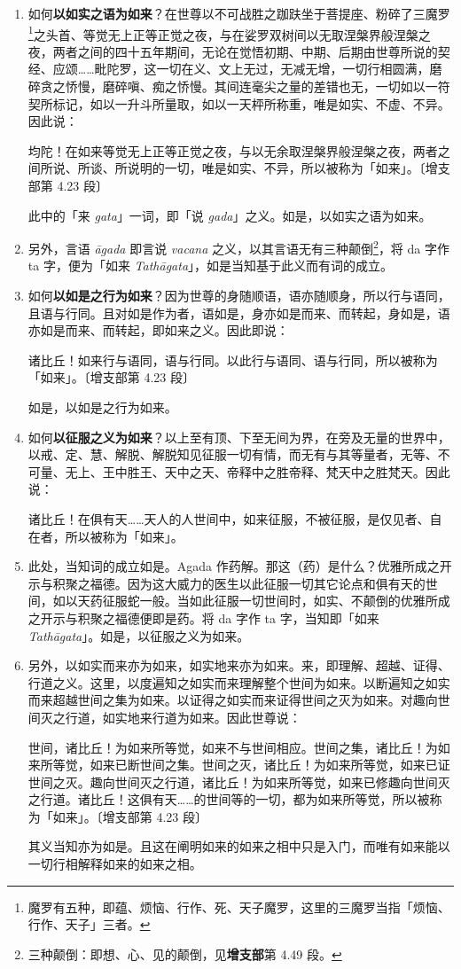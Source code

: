 \begin{enumerate}
\item 如何\textbf{以如实之语为如来}？在世尊以不可战胜之跏趺坐于菩提座、粉碎了三魔罗\footnote{魔罗有五种，即蕴、烦恼、行作、死、天子魔罗，这里的三魔罗当指「烦恼、行作、天子」三者。}之头首、等觉无上正等正觉之夜，与在娑罗双树间以无取涅槃界般涅槃之夜，两者之间的四十五年期间，无论在觉悟初期、中期、后期由世尊所说的契经、应颂……毗陀罗，这一切在义、文上无过，无减无增，一切行相圆满，磨碎贪之㤭慢，磨碎嗔、痴之㤭慢。其间连毫尖之量的差错也无，一切如以一符契所标记，如以一升斗所量取，如以一天枰所称重，唯是如实、不虚、不异。因此说：\begin{quoting}均陀！在如来等觉无上正等正觉之夜，与以无余取涅槃界般涅槃之夜，两者之间所说、所谈、所说明的一切，唯是如实、不异，所以被称为「如来」。{\bluefootnotesize 〔增支部第 4.23 段〕}\end{quoting}此中的「来 \textit{gata}」一词，即「说 \textit{gada}」之义。如是，以如实之语为如来。
\item 另外，言语 \textit{āgada} 即言说 \textit{vacana} 之义，以其言语无有三种颠倒\footnote{三种颠倒：即想、心、见的颠倒，见\textbf{增支部}第 4.49 段。}，将 da 字作 ta 字，便为「如来 \textit{Tathāgata}」，如是当知基于此义而有词的成立。
\item 如何\textbf{以如是之行为如来}？因为世尊的身随顺语，语亦随顺身，所以行与语同，且语与行同。且对如是作为者，语如是，身亦如是而来、而转起，身如是，语亦如是而来、而转起，即如来之义。因此即说：\begin{quoting}诸比丘！如来行与语同，语与行同。以此行与语同、语与行同，所以被称为「如来」。{\bluefootnotesize 〔增支部第 4.23 段〕}\end{quoting}如是，以如是之行为如来。
\item 如何\textbf{以征服之义为如来}？以上至有顶、下至无间为界，在旁及无量的世界中，以戒、定、慧、解脱、解脱知见征服一切有情，而无有与其等量者，无等、不可量、无上、王中胜王、天中之天、帝释中之胜帝释、梵天中之胜梵天。因此说：\begin{quoting}诸比丘！在俱有天……天人的人世间中，如来征服，不被征服，是仅见者、自在者，所以被称为「如来」。\end{quoting}
\item 此处，当知词的成立如是。Agada 作药解。那这（药）是什么？优雅所成之开示与积聚之福德。因为这大威力的医生以此征服一切其它论点和俱有天的世间，如以天药征服蛇一般。当如此征服一切世间时，如实、不颠倒的优雅所成之开示与积聚之福德便即是药。将 da 字作 ta 字，当知即「如来 \textit{Tathāgata}」。如是，以征服之义为如来。
\item 另外，以如实而来亦为如来，如实地来亦为如来。来，即理解、超越、证得、行道之义。这里，以度遍知之如实而来理解整个世间为如来。以断遍知之如实而来超越世间之集为如来。以证得之如实而来证得世间之灭为如来。对趣向世间灭之行道，如实地来行道为如来。因此世尊说：\begin{quoting}世间，诸比丘！为如来所等觉，如来不与世间相应。世间之集，诸比丘！为如来所等觉，如来已断世间之集。世间之灭，诸比丘！为如来所等觉，如来已证世间之灭。趣向世间灭之行道，诸比丘！为如来所等觉，如来已修趣向世间灭之行道。诸比丘！这俱有天……的世间等的一切，都为如来所等觉，所以被称为「如来」。{\bluefootnotesize 〔增支部第 4.23 段〕}\end{quoting}其义当知亦为如是。且这在阐明如来的如来之相中只是入门，而唯有如来能以一切行相解释如来的如来之相。

\end{enumerate}
